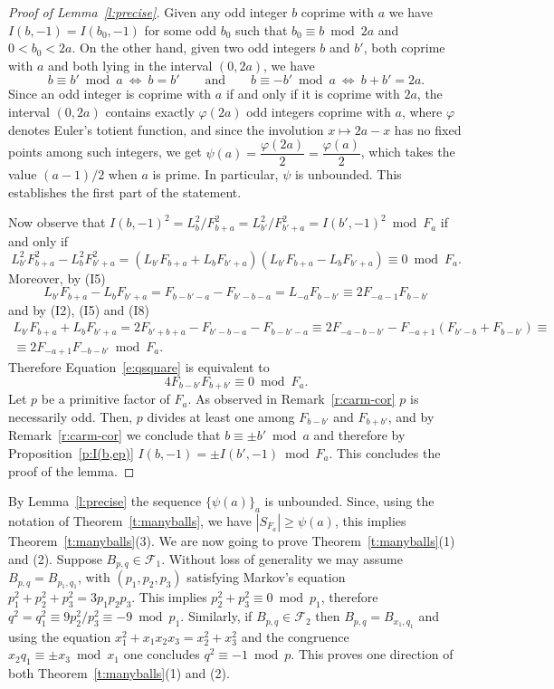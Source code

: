 \documentclass[11pt,a4paper]{amsart}
\newcommand{\F}{\mathcal F}
\theoremstyle{definition}
\numberwithin{equation}{section}
\begin{document}
\begin{proof}[Proof of Lemma~\ref{l:precise}]  
Given any odd integer $b$ coprime with $a$ 
we have $I(b,-1)=I(b_0,-1)$ for some odd $b_0$ such that $b_0 \equiv b \bmod 2a$ 
and $0<b_0<2a$. On the other hand, given two odd integers $b$ and $b'$, both coprime 
with $a$ and both lying in the interval $(0,2a)$, we have
\[ 
b \equiv b' \bmod a\ \Longleftrightarrow\  b=b' 
\qquad \text{and} \qquad 
b \equiv -b' \bmod a\ \Longleftrightarrow\ b+b'=2a.
\]
Since an odd integer is coprime with $a$ if and only if it is coprime with $2a$, the 
interval $(0,2a)$ contains exactly $\varphi(2a)$ odd integers coprime with $a$, 
where $\varphi$ denotes Euler's totient function, and since the involution 
$x \mapsto 2a-x$ has no fixed points among such integers, we 
get $\psi(a)=\dfrac{\varphi(2a)}{2}=\dfrac{\varphi(a)}{2}$, 
which takes the value $(a-1)/2$ when $a$ is prime. In particular, $\psi$ is unbounded. 
This establishes the first part of the statement. 

Now observe that 
$I(b,-1)^2=L_b^2/F_{b+a}^2 = L_{b'}^2/F_{b'+a}^2=I(b',-1)^2\bmod F_a$ if and only if 
\begin{equation}\label{e:qsquare}
L_{b'}^2 F_{b+a}^2 - L_b^2 F_{b'+a}^2  = 
(L_{b'} F_{b+a} + L_b F_{b'+a})(L_{b'} F_{b+a} - L_b F_{b'+a})\equiv 0\bmod F_a.
\end{equation} 
Moreover, by (I5) 
\[
L_{b'} F_{b+a} - L_b F_{b'+a} =  
F_{b-b'-a} - F_{b'-b-a} = L_{-a} F_{b-b'} 
\equiv 2 F_{-a - 1} F_{b-b'} 
\]
and by (I2), (I5) and (I8) 
\[
\begin{split}
L_{b'} F_{b+a} + L_b F_{b'+a} = 
2F_{b'+b+a} - F_{b'-b-a} - F_{b-b'-a} \equiv    
2F_{-a-b-b'} - F_{-a + 1} (F_{b'-b}+F_{b-b'})\equiv \\
\equiv 2 F_{-a + 1} F_{-b-b'} \bmod F_a. 
\end{split}
\]
Therefore Equation~\eqref{e:qsquare} is equivalent to 
\[
4 F_{b-b'} F_{b+b'} \equiv 0\bmod F_a.
\]
Let $p$ be a primitive factor of $F_a$. As observed in Remark~\ref{r:carm-cor} $p$ is necessarily odd. 
Then, $p$ divides at least one among $F_{b-b'}$ and $F_{b+b'}$, 
and by Remark~\ref{r:carm-cor} we conclude that $b \equiv \pm b' \bmod a$ 
and therefore by Proposition~\ref{p:I(b,ep)} $I(b,-1)=\pm I(b',-1)\bmod F_a$. 
This concludes the proof of the lemma.
\end{proof} 

By Lemma~\ref{l:precise} the sequence $\{\psi(a)\}_a$ is unbounded. 
Since, using the notation of Theorem~\ref{t:manyballs}, we have $|S_{F_a}|\geq\psi(a)$, this implies Theorem~\ref{t:manyballs}(3). 
We are now going to prove Theorem~\ref{t:manyballs}(1) and (2). 
Suppose $B_{p,q}\in\F_1$. Without loss of generality we may assume $B_{p,q}=B_{p_1,q_1}$, with $(p_1,p_2,p_3)$ satisfying Markov's equation $p_1^2+p_2^2+p_3^2 = 3 p_1 p_2 p_3$. 
This implies $p_2^2+p_3^2\equiv 0\bmod p_1$, therefore $q^2 = q_1^2 \equiv 9p_2^2/p_3^2 \equiv -9\bmod p_1$. 
Similarly, if $B_{p,q}\in\F_2$ then $B_{p,q}=B_{x_1,q_1}$ and using the equation $x_1^2+ x_1 x_2 x_3 = x_2^2+x_3^2$ and the congruence $x_2 q_1 \equiv\pm x_3\bmod x_1$ one concludes $q^2\equiv -1\bmod p$. 
This proves one direction of both Theorem~\ref{t:manyballs}(1) and (2). 
\end{document}
